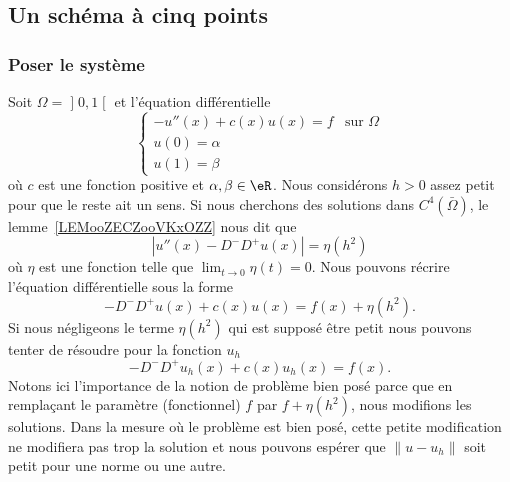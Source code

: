 \subsection{Un schéma à cinq points}

\subsubsection{Poser le système}

Soit \( \Omega=\mathopen] 0 , 1 \mathclose[\) et l'équation différentielle
	\begin{equation}        \label{EQooXJBWooRhCsLy}
		\begin{cases}
			-u''(x)+c(x)u(x)=f & \text{sur } \Omega \\
			u(0)=\alpha                             \\
			u(1)=\beta
		\end{cases}
	\end{equation}
	où \( c\) est une fonction positive et \( \alpha,\beta\in \eR\). Nous considérons \( h>0\) assez petit pour que le reste ait un sens. Si nous cherchons des solutions dans \( C^4(\bar\Omega)\), le lemme~\ref{LEMooZECZooVKxOZZ} nous dit que
	\begin{equation}
		| u''(x)-D^-D^+u(x) |=\eta(h^2)
	\end{equation}
	où \( \eta\) est une fonction telle que \( \lim_{t\to 0} \eta(t)=0\). Nous pouvons récrire l'équation différentielle sous la forme
	\begin{equation}
		-D^-D^+u(x)+c(x)u(x)=f(x)+\eta(h^2).
	\end{equation}
	Si nous négligeons le terme \( \eta(h^2)\) qui est supposé être petit nous pouvons tenter de résoudre pour la fonction \( u_h\)
	\begin{equation}
		-D^-D^+u_h(x)+c(x)u_h(x)=f(x).
	\end{equation}
	Notons ici l'importance de la notion de problème bien posé parce que en remplaçant le paramètre (fonctionnel) \( f\) par \( f+\eta(h^2)\), nous modifions les solutions. Dans la mesure où le problème est bien posé, cette petite modification ne modifiera pas trop la solution et nous pouvons espérer que \( \| u-u_h \|\) soit petit pour une norme ou une autre.

